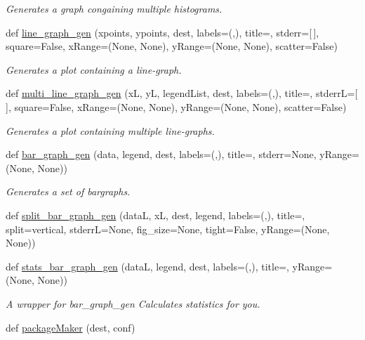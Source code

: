 \begin{DoxyCompactItemize}
\begin{DoxyCompactList}\small\item\em Generates a graph congaining multiple histograms. \end{DoxyCompactList}\item 
def \mbox{\hyperlink{namespaceplot_script_a89b69d60f527ba35b15023f1a0b42a32}{line\+\_\+graph\+\_\+gen}} (xpoints, ypoints, dest, labels=(\textquotesingle{}\textquotesingle{},\textquotesingle{}\textquotesingle{}), title=\textquotesingle{}\textquotesingle{}, stderr=\mbox{[}$\,$\mbox{]}, square=False, x\+Range=(None, None), y\+Range=(None, None), scatter=False)
\begin{DoxyCompactList}\small\item\em Generates a plot containing a line-\/graph. \end{DoxyCompactList}\item 
def \mbox{\hyperlink{namespaceplot_script_a01b41986172744db0c2689fb01aab2ea}{multi\+\_\+line\+\_\+graph\+\_\+gen}} (xL, yL, legend\+List, dest, labels=(\textquotesingle{}\textquotesingle{},\textquotesingle{}\textquotesingle{}), title=\textquotesingle{}\textquotesingle{}, stderrL=\mbox{[}$\,$\mbox{]}, square=False, x\+Range=(None, None), y\+Range=(None, None), scatter=False)
\begin{DoxyCompactList}\small\item\em Generates a plot containing multiple line-\/graphs. \end{DoxyCompactList}\item 
def \mbox{\hyperlink{namespaceplot_script_ac3cc0076fbd782e94e304d688f05fc13}{bar\+\_\+graph\+\_\+gen}} (data, legend, dest, labels=(\textquotesingle{}\textquotesingle{},\textquotesingle{}\textquotesingle{}), title=\textquotesingle{}\textquotesingle{}, stderr=None, y\+Range=(None, None))
\begin{DoxyCompactList}\small\item\em Generates a set of bargraphs. \end{DoxyCompactList}\item 
def \mbox{\hyperlink{namespaceplot_script_ac772715f9040acff0f535ae7d04081cb}{split\+\_\+bar\+\_\+graph\+\_\+gen}} (dataL, xL, dest, legend, labels=(\textquotesingle{}\textquotesingle{},\textquotesingle{}\textquotesingle{}), title=\textquotesingle{}\textquotesingle{}, split=\textquotesingle{}vertical\textquotesingle{}, stderrL=None, fig\+\_\+size=None, tight=False, y\+Range=(None, None))
\item 
def \mbox{\hyperlink{namespaceplot_script_ae87a1114e1400e2ae552a6ffb1e4a544}{stats\+\_\+bar\+\_\+graph\+\_\+gen}} (dataL, legend, dest, labels=(\textquotesingle{}\textquotesingle{},\textquotesingle{}\textquotesingle{}), title=\textquotesingle{}\textquotesingle{}, y\+Range=(None, None))
\begin{DoxyCompactList}\small\item\em A wrapper for bar\+\_\+graph\+\_\+gen Calculates statistics for you. \end{DoxyCompactList}\item 
def \mbox{\hyperlink{namespaceplot_script_ac75988d18d4d015f4d412c3470420702}{package\+Maker}} (dest, conf)
\end{DoxyCompactItemize}
